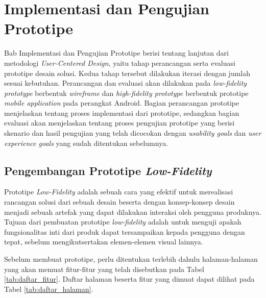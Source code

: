 \chapter{Implementasi dan Pengujian Prototipe}

Bab Implementasi dan Pengujian Prototipe berisi tentang lanjutan dari metodologi \textit{User-Centered Design}, yaitu tahap perancangan serta evaluasi prototipe desain solusi. Kedua tahap tersebut dilakukan iterasi dengan jumlah sesuai kebutuhan. Perancangan dan evaluasi akan dilakukan pada \textit{low-fidelity prototype} berbentuk \textit{wireframe} dan \textit{high-fidelity prototype} berbentuk prototipe \textit{mobile application} pada perangkat Android. Bagian perancangan prototipe menjelaskan tentang proses implementasi dari prototipe, sedangkan bagian evaluasi akan menjelaskan tentang proses pengujian prototipe yang berisi skenario dan hasil pengujian yang telah dicocokan dengan \textit{usability goals} dan \textit{user experience goals} yang sudah ditentukan sebelumnya. 

\section{Pengembangan Prototipe \textit{Low-Fidelity}}
Prototipe \textit{Low-Fidelity} adalah sebuah cara yang efektif untuk merealisasi rancangan solusi dari sebuah desain beserta dengan konsep-konsep desain menjadi sebuah artefak yang dapat dilakukan interaksi oleh pengguna produknya. \parencite{adobe2017prototype} Tujuan dari pembuatan prototipe \textit{low-fidelity} adalah untuk menguji apakah fungsionalitas inti dari produk dapat tersampaikan kepada pengguna dengan tepat, sebelum mengikutsertakan elemen-elemen visual lainnya. 

Sebelum membuat prototipe, perlu ditentukan terlebih dahulu halaman-halaman yang akan memuat fitur-fitur yang telah disebutkan pada Tabel \ref{tab:daftar_fitur}. Daftar halaman beserta fitur yang dimuat dapat dilihat pada Tabel \ref{tab:daftar_halaman}.


